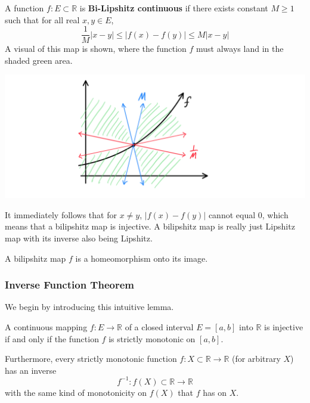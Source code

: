 \documentclass{article}
\begin{document}
    \begin{definition}
      A function $f: E \subset \mathbb{R}$ is \textbf{Bi-Lipshitz continuous} if there exists constant $M\geq 1$ such that for all real $x, y \in E$, 
      \[ \frac{1}{M} |x - y| \leq |f(x) - f(y)| \leq M |x - y|\]
      A visual of this map is shown, where the function $f$ must always land in the shaded green area. 
      \begin{center}
          \includegraphics[scale=0.25]{img/BiLipshitz_Map.PNG}
      \end{center}
      It immediately follows that for $x \neq y$, $ |f(x) - f(y)|$ cannot equal $0$, which means that a bilipshitz map is injective. A bilipshitz map is really just Lipshitz map with its inverse also being Lipshitz. 
    \end{definition}

    \begin{proposition}
    A bilipshitz map $f$ is a homeomorphism onto its image. 
    \end{proposition}

    \subsubsection{Inverse Function Theorem}

    We begin by introducing this intuitive lemma. 
    \begin{lemma}
      A continuous mapping $f: E \longrightarrow \mathbb{R}$ of a closed interval $E = [a,b]$ into $\mathbb{R}$ is injective if and only if the function $f$ is strictly monotonic on $[a,b]$. 

      Furthermore, every strictly monotonic function $f: X \subset \mathbb{R} \longrightarrow \mathbb{R}$ (for arbitrary $X$) has an inverse 
      \[f^{-1}: f(X) \subset \mathbb{R} \longrightarrow \mathbb{R}\]
      with the same kind of monotonicity on $f(X)$ that $f$ has on $X$. 
    \end{lemma}
\end{document}
